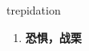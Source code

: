 
\begin{frame}
{\huge trepidation}
\begin{center}
\begin{enumerate}\Large
  \item \textbf{恐惧，战栗}
\end{enumerate}
\end{center}
\end{frame}
